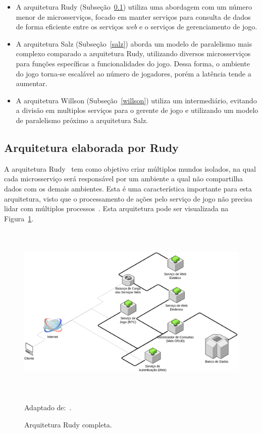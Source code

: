 \begin{itemize}
 \item A arquitetura Rudy (Subseção~\ref{rudy}) utiliza uma abordagem com um número menor de microsserviços, focado em manter serviços para consulta de dados de forma eficiente entre os serviços \textit{web} e o serviços de gerenciamento de jogo.
 \item A arquitetura Salz (Subseção~\ref{salz}) aborda um modelo de paralelismo mais complexo comparado a arquitetura Rudy, utilizando diversos microsserviços para funções específicas a funcionalidades do jogo.
%
Dessa forma, o ambiente do jogo torna-se escalável ao número de jogadores, porém a latência tende a aumentar.
\item A arquitetura Willson (Subseção~\ref{willson}) utiliza um intermediário, evitando a divisão em multiplos serviços para o gerente de jogo e utilizando um modelo de paralelismo próximo a arquitetura Salz.
\end{itemize}


\subsection{Arquitetura elaborada por Rudy}
\label{rudy}


A arquitetura Rudy~\cite{matthiasrudy2011} tem como objetivo criar múltiplos mundos isolados, na qual cada microsserviço será responsável por um ambiente a qual não compartilha dados com os demais ambientes.
%
Esta é uma característica importante para esta arquitetura, visto que o processamento de ações pelo serviço de jogo não precisa lidar com múltiplos processos~\cite{matthiasrudy2011}.
%
Esta arquitetura pode ser visualizada na Figura~\ref{full_rudy}.

\begin{figure}[htb!]
  \caption{Arquitetura Rudy completa.}
  \label{full_rudy}
  \includegraphics[height=8.5cm]{arquiteturas/full_rudy.png}
  \centering

  Adaptado de:~\cite{matthiasrudy2011}.
\end{figure}

